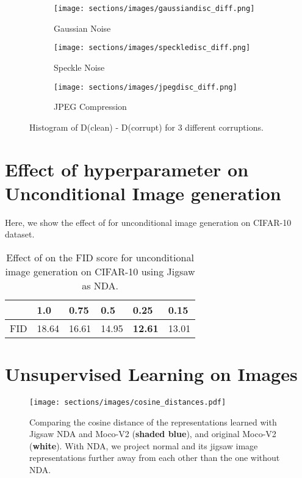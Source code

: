 \documentclass{article} \usepackage{iclr2021_conference,times}
\begin{document}
\begin{figure*}[!ht]
\begin{subfigure}[b]{0.3\textwidth}
\centering
    \texttt{[image: sections/images/gaussiandisc\_diff.png]}
    \caption{Gaussian Noise}
    \label{fig:anomaly_zoom}
\end{subfigure}
\begin{subfigure}[b]{0.3\textwidth}
\centering
    \texttt{[image: sections/images/speckledisc\_diff.png]}
\caption{Speckle Noise}
\label{fig:anomaly_speckle}
\end{subfigure}
\begin{subfigure}[b]{0.3\textwidth}
\centering
    \texttt{[image: sections/images/jpegdisc\_diff.png]}
\caption{JPEG Compression}
\label{fig:anomaly_jpeg}
\end{subfigure}
\caption{Histogram of D(clean) - D(corrupt) for 3 different corruptions.}
\label{fig:anomaly}
\end{figure*}

\section{Effect of hyperparameter on Unconditional Image generation}
\label{app:lambda}
Here, we show the effect of  for unconditional image generation on CIFAR-10 dataset.

\begin{table}[!h]
  \caption{Effect of  on the FID score for unconditional image generation on CIFAR-10 using Jigsaw as NDA.}
  \label{table:alpha_beta}
  \centering
  \begin{tabular}{llllll}
    \toprule
     & 1.0 & 0.75 & 0.5 & 0.25 & 0.15\\
    \midrule
    FID & 18.64 & 16.61 & 14.95 & \textbf{12.61} & 13.01\\
    \bottomrule
  \end{tabular}
\end{table}

\section{Unsupervised Learning on Images}

\begin{figure}[!htb]
\centering
    \texttt{[image: sections/images/cosine\_distances.pdf]}
    \caption{Comparing the cosine distance of the representations learned with Jigsaw NDA and Moco-V2 (\textbf{shaded blue}), and original Moco-V2 (\textbf{white}). With NDA, we project normal and its jigsaw image representations further away from each other than the one without NDA.}
    \label{fig:cosine}
\end{figure}
\end{document}
